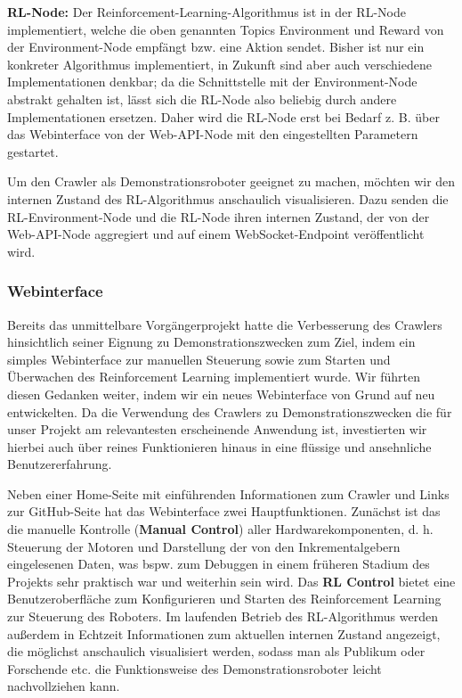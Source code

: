 \textbf{RL-Node:} Der Reinforcement-Learning-Algorithmus ist in der RL-Node implementiert, welche die oben genannten Topics Environment und Reward von der Environment-Node empfängt bzw. eine Aktion sendet. Bisher ist nur ein konkreter Algorithmus implementiert, in Zukunft sind aber auch verschiedene Implementationen denkbar; da die Schnittstelle mit der Environment-Node abstrakt gehalten ist, lässt sich die RL-Node also beliebig durch andere Implementationen ersetzen. Daher wird die RL-Node erst bei Bedarf z. B. über das Webinterface von der Web-API-Node mit den eingestellten Parametern gestartet.

Um den Crawler als Demonstrationsroboter geeignet zu machen, möchten wir den internen Zustand des RL-Algorithmus anschaulich visualisieren. Dazu senden die RL-Environment-Node und die RL-Node ihren internen Zustand, der von der Web-API-Node aggregiert und auf einem WebSocket-Endpoint veröffentlicht wird. 

\subsubsection{Webinterface}

Bereits das unmittelbare Vorgängerprojekt hatte die Verbesserung des Crawlers hinsichtlich seiner Eignung zu Demonstrationszwecken zum Ziel, indem ein simples Webinterface zur manuellen Steuerung sowie zum Starten und Überwachen des Reinforcement Learning implementiert wurde. Wir führten diesen Gedanken weiter, indem wir ein neues Webinterface von Grund auf neu entwickelten. Da die Verwendung des Crawlers zu Demonstrationszwecken die für unser Projekt am relevantesten erscheinende Anwendung ist, investierten wir hierbei auch über reines Funktionieren hinaus in eine flüssige und ansehnliche Benutzererfahrung. 

Neben einer Home-Seite mit einführenden Informationen zum Crawler und Links zur GitHub-Seite hat das Webinterface zwei Hauptfunktionen. Zunächst ist das die manuelle Kontrolle (\textbf{Manual Control}) aller Hardwarekomponenten, d. h. Steuerung der Motoren und Darstellung der von den Inkrementalgebern eingelesenen Daten, was bspw. zum Debuggen in einem früheren Stadium des Projekts sehr praktisch war und weiterhin sein wird. Das \textbf{RL Control} bietet eine Benutzeroberfläche zum Konfigurieren und Starten des Reinforcement Learning zur Steuerung des Roboters. Im laufenden Betrieb des RL-Algorithmus werden außerdem in Echtzeit Informationen zum aktuellen internen Zustand angezeigt, die möglichst anschaulich visualisiert werden, sodass man als Publikum oder Forschende etc. die Funktionsweise des Demonstrationsroboter leicht nachvollziehen kann.


